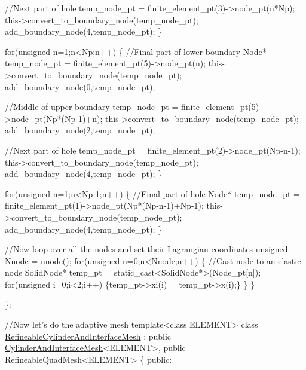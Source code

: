 \begin{DoxyCodeInclude}
     \textcolor{comment}{//Next part of hole}
     temp\_node\_pt = finite\_element\_pt(3)->node\_pt(n*Np);
     this->convert\_to\_boundary\_node(temp\_node\_pt);
     add\_boundary\_node(4,temp\_node\_pt);
    \}

   \textcolor{keywordflow}{for}(\textcolor{keywordtype}{unsigned} n=1;n<Np;n++)
    \{
     \textcolor{comment}{//Final part of lower boundary}
     Node* temp\_node\_pt = finite\_element\_pt(5)->node\_pt(n);
     this->convert\_to\_boundary\_node(temp\_node\_pt);
     add\_boundary\_node(0,temp\_node\_pt);
     
     \textcolor{comment}{//Middle of upper boundary                                }
     temp\_node\_pt = finite\_element\_pt(5)->node\_pt(Np*(Np-1)+n);
     this->convert\_to\_boundary\_node(temp\_node\_pt);
     add\_boundary\_node(2,temp\_node\_pt);
     
     \textcolor{comment}{//Next part of hole}
     temp\_node\_pt = finite\_element\_pt(2)->node\_pt(Np-n-1);
     this->convert\_to\_boundary\_node(temp\_node\_pt);
     add\_boundary\_node(4,temp\_node\_pt);
    \}

   \textcolor{keywordflow}{for}(\textcolor{keywordtype}{unsigned} n=1;n<Np-1;n++)
    \{
     \textcolor{comment}{//Final part of hole}
     Node* temp\_node\_pt = finite\_element\_pt(1)->node\_pt(Np*(Np-n-1)+Np-1);
     this->convert\_to\_boundary\_node(temp\_node\_pt);
     add\_boundary\_node(4,temp\_node\_pt);
    \}
   
   \textcolor{comment}{//Now loop over all the nodes and set their Lagrangian coordinates}
   \textcolor{keywordtype}{unsigned} Nnode = nnode();
   \textcolor{keywordflow}{for}(\textcolor{keywordtype}{unsigned} n=0;n<Nnode;n++)
   \{
    \textcolor{comment}{//Cast node to an elastic node}
    SolidNode* temp\_pt = \textcolor{keyword}{static\_cast<}SolidNode*\textcolor{keyword}{>}(Node\_pt[n]);
    \textcolor{keywordflow}{for}(\textcolor{keywordtype}{unsigned} i=0;i<2;i++)
     \{temp\_pt->xi(i) = temp\_pt->x(i);\}
   \}
 \}

 
\};

\textcolor{comment}{//Now let's do the adaptive mesh}
\textcolor{keyword}{template}<\textcolor{keyword}{class} ELEMENT>
\textcolor{keyword}{class }\hyperlink{classRefineableCylinderAndInterfaceMesh}{RefineableCylinderAndInterfaceMesh} :
 \textcolor{keyword}{public} \hyperlink{classCylinderAndInterfaceMesh}{CylinderAndInterfaceMesh}<ELEMENT>, \textcolor{keyword}{public} RefineableQuadMesh<ELEMENT>
\{
\textcolor{keyword}{public}: 


\end{DoxyCodeInclude}
